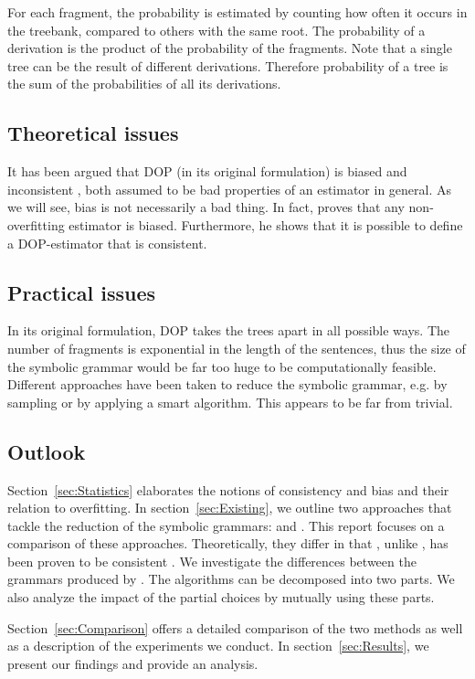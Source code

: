 For each fragment, the probability is estimated by counting how often it occurs in the treebank, compared to others with the same root. The probability of a derivation is the product of the probability of the fragments. Note that a single tree can be the result of different derivations. Therefore probability of a tree is the sum of the probabilities of all its derivations.

\subsection{Theoretical issues}
It has been argued that DOP (in its original formulation) is biased and inconsistent \cite{johnson2002}, both assumed to be bad properties of an estimator in general. As we will see, bias is not necessarily a bad thing. In fact, \cite{zollmann2005} proves that any non-overfitting estimator is biased. Furthermore, he shows that it is possible to define a DOP-estimator that is consistent.


\subsection{Practical issues}
In its original formulation, DOP takes the trees apart in all possible ways. The number of fragments is exponential in the length of the sentences, thus the size of the symbolic grammar would be far too huge to be computationally feasible. 
Different approaches have been taken to reduce the symbolic grammar, e.g. by sampling or by applying a smart algorithm. This appears to be far from trivial.


\subsection{Outlook}
Section~\ref{sec:Statistics} elaborates the notions of consistency and bias and their relation to overfitting.
In section~\ref{sec:Existing}, we outline two approaches that tackle the reduction of the symbolic grammars: \ddop{} and \dops{}. This report focuses on a comparison of these approaches. Theoretically, they differ in that \dops{}, unlike \ddop{}, has been proven to be consistent \cite{zollmann2005}. We investigate the differences between the grammars produced by \ddop{} \dops{}. The algorithms can be decomposed into two parts. We also analyze the impact of the partial choices by mutually using these parts.

Section~\ref{sec:Comparison} offers a detailed comparison of the two methods as well as a description of the experiments we conduct. In section~\ref{sec:Results}, we present our findings and provide an analysis. 


